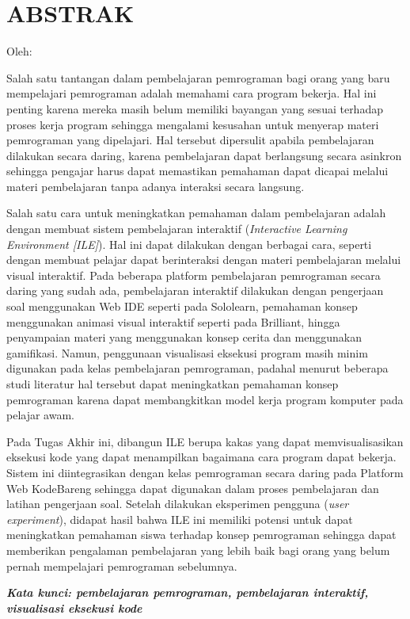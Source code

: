 \clearpage
\chapter*{ABSTRAK}

\begin{center}
  \center
  \begin{singlespace}
    \bfseries \MakeUppercase{\thetitle}

    \normalfont\normalsize
    Oleh:

    \bfseries \theauthor
  \end{singlespace}
\end{center}


\begin{singlespace}
  Salah satu tantangan dalam pembelajaran pemrograman bagi orang yang baru mempelajari pemrograman adalah memahami cara program bekerja. Hal ini penting karena mereka masih belum memiliki bayangan yang sesuai terhadap proses kerja program sehingga mengalami kesusahan untuk menyerap materi pemrograman yang dipelajari. Hal tersebut dipersulit apabila pembelajaran dilakukan secara daring, karena pembelajaran dapat berlangsung secara asinkron sehingga pengajar harus dapat memastikan pemahaman dapat dicapai melalui materi pembelajaran tanpa adanya interaksi secara langsung.

  Salah satu cara untuk meningkatkan pemahaman dalam pembelajaran adalah dengan membuat sistem pembelajaran interaktif (\textit{Interactive Learning Environment [ILE]}). Hal ini dapat dilakukan dengan berbagai cara, seperti dengan membuat pelajar dapat berinteraksi dengan materi pembelajaran melalui visual interaktif. Pada beberapa platform pembelajaran pemrograman secara daring yang sudah ada, pembelajaran interaktif dilakukan dengan pengerjaan soal menggunakan Web IDE seperti pada Sololearn, pemahaman konsep menggunakan animasi visual interaktif seperti pada Brilliant, hingga penyampaian materi yang menggunakan konsep cerita dan menggunakan gamifikasi. Namun, penggunaan visualisasi eksekusi program masih minim digunakan pada kelas pembelajaran pemrograman, padahal menurut beberapa studi literatur hal tersebut dapat meningkatkan pemahaman konsep pemrograman karena dapat membangkitkan model kerja program komputer pada pelajar awam.

  Pada Tugas Akhir ini, dibangun ILE berupa kakas yang dapat memvisualisasikan eksekusi kode yang dapat menampilkan bagaimana cara program dapat bekerja. Sistem ini diintegrasikan dengan kelas pemrograman secara daring pada Platform Web KodeBareng sehingga dapat digunakan dalam proses pembelajaran dan latihan pengerjaan soal. Setelah dilakukan eksperimen pengguna (\textit{user experiment}), didapat hasil bahwa ILE ini memiliki potensi untuk dapat meningkatkan pemahaman siswa terhadap konsep pemrograman sehingga dapat memberikan pengalaman pembelajaran yang lebih baik bagi orang yang belum pernah mempelajari pemrograman sebelumnya.

  \textbf{\textit{Kata kunci: pembelajaran pemrograman, pembelajaran interaktif, visualisasi eksekusi kode}}
\end{singlespace}
\clearpage
